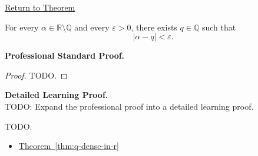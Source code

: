 \newpage
{}
\label{prf:every-irrational-can-be-approximated-by-rationals}

\begin{remark*}[Return]
\hyperref[cor:every-irrational-can-be-approximated-by-rationals]{Return to Theorem}
\end{remark*}

\begin{theorem*}
For every $\alpha\in\mathbb{R}\setminus\mathbb{Q}$ and every $\varepsilon>0$,
there exists $q\in\mathbb{Q}$ such that
\[
|\alpha-q|<\varepsilon.
\]
\end{theorem*}

\textbf{Professional Standard Proof.}~\\
\begin{proof}
TODO.
\end{proof}

\textbf{Detailed Learning Proof.}~\\
TODO: Expand the professional proof into a detailed learning proof.


\begin{remark*}
TODO.
\end{remark*}

\begin{dependencies}
\begin{itemize}
  \item \hyperref[thm:q-dense-in-r]{Theorem~\ref*{thm:q-dense-in-r}}
\end{itemize}
\end{dependencies}


